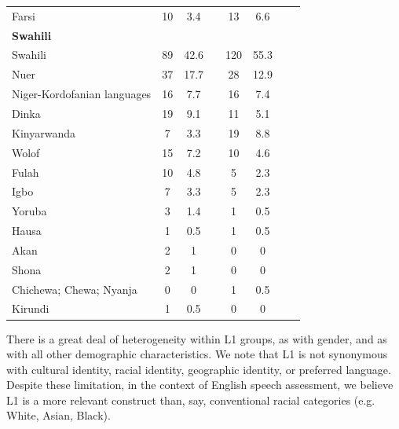 \documentclass [PhD] {uclathes}
\begin{document}
\begin{table}[htbp]
\begin{tabular}{lccccccc}
\hspace{3mm} Farsi & 10 & 3.4 & & 13 & 6.6 \\
\textbf{Swahili} & & & & & \\
\hspace{3mm} Swahili & 89 & 42.6 & & 120 & 55.3 \\
\hspace{3mm} Nuer & 37 & 17.7 & & 28 & 12.9 \\
\hspace{3mm} Niger-Kordofanian languages & 16 & 7.7 & & 16 & 7.4 \\
\hspace{3mm} Dinka & 19 & 9.1 & & 11 & 5.1 \\
\hspace{3mm} Kinyarwanda & 7 & 3.3 & & 19 & 8.8 \\
\hspace{3mm} Wolof & 15 & 7.2 & & 10 & 4.6 \\
\hspace{3mm} Fulah & 10 & 4.8 & & 5 & 2.3 \\
\hspace{3mm} Igbo & 7 & 3.3 & & 5 & 2.3 \\
\hspace{3mm} Yoruba & 3 & 1.4 & & 1 & 0.5 \\
\hspace{3mm} Hausa & 1 & 0.5 & & 1 & 0.5 \\
\hspace{3mm} Akan & 2 & 1 & & 0 & 0 \\
\hspace{3mm} Shona & 2 & 1 & & 0 & 0 \\
\hspace{3mm} Chichewa; Chewa; Nyanja & 0 & 0 & & 1 & 0.5 \\
\hspace{3mm} Kirundi & 1 & 0.5 & & 0 & 0 \\
    \bottomrule
    \end{tabular}
\end{table}

There is a great deal of heterogeneity within L1 groups, as with gender, and as with all other demographic characteristics. We note that L1 is not synonymous with cultural identity, racial identity, geographic identity, or preferred language. Despite these limitation, in the context of English speech assessment, we believe L1 is a more relevant construct than, say, conventional racial categories (e.g. White, Asian, Black). 
\end{document}
